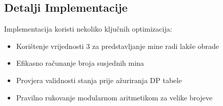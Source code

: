 \subsection{Detalji Implementacije}
Implementacija koristi nekoliko ključnih optimizacija:
\begin{itemize}
    \item Korištenje vrijednosti 3 za predstavljanje mine radi lakše obrade
    \item Efikasno računanje broja susjednih mina
    \item Provjera validnosti stanja prije ažuriranja DP tabele
    \item Pravilno rukovanje modularnom aritmetikom za velike brojeve
\end{itemize} 